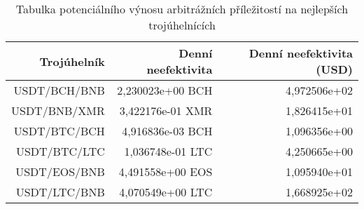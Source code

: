 \begin{table}\centering
\caption{Tabulka potenciálního výnosu arbitrážních příležitostí na nejlepších trojúhelnících}
\label{table_gains_best}
\begin{tabular}{|| r | r | r ||}\hline Trojúhelník & Denní neefektivita & Denní neefektivita (USD)\\ [0.5ex]
 \hline\hline USDT/BCH/BNB & 2,230023e+00 BCH & 4,972506e+02\\ 
 \hline USDT/BNB/XMR & 3,422176e-01 XMR & 1,826415e+01\\ 
 \hline USDT/BTC/BCH & 4,916836e-03 BCH & 1,096356e+00\\ 
 \hline USDT/BTC/LTC & 1,036748e-01 LTC & 4,250665e+00\\ 
 \hline USDT/EOS/BNB & 4,491558e+00 EOS & 1,095940e+01\\ 
 \hline USDT/LTC/BNB & 4,070549e+00 LTC & 1,668925e+02\\ 
 \hline
\end{tabular}
\end{table}